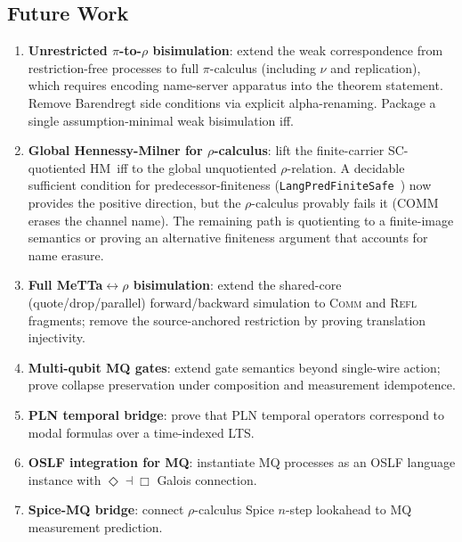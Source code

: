 \documentclass[11pt]{article}
\theoremstyle{definition}
\theoremstyle{remark}
\begin{document}
\subsection{Future Work}

\begin{enumerate}[leftmargin=1.5em]
  \item \textbf{Unrestricted $\pi$-to-$\rho$ bisimulation}: extend the
    weak correspondence from restriction-free processes to full
    $\pi$-calculus (including $\nu$ and replication), which requires
    encoding name-server apparatus into the theorem statement.  Remove
    Barendregt side conditions via explicit alpha-renaming.  Package a
    single assumption-minimal weak bisimulation iff.
  \item \textbf{Global Hennessy-Milner for $\rho$-calculus}: lift the
    finite-carrier SC-quotiented HM~iff to the global unquotiented
    $\rho$-relation.  A decidable sufficient condition for
    predecessor-finiteness (\texttt{LangPredFiniteSafe}~\cite{leanOSLF2025})
    now provides the positive direction, but the $\rho$-calculus provably
    fails it (COMM erases the channel name).  The remaining path is
    quotienting to a finite-image semantics or proving an alternative
    finiteness argument that accounts for name erasure.
  \item \textbf{Full MeTTa$\leftrightarrow$$\rho$ bisimulation}: extend
    the shared-core (quote/drop/parallel) forward/backward simulation to
    \textsc{Comm} and \textsc{Refl} fragments; remove the
    source-anchored restriction by proving translation injectivity.
  \item \textbf{Multi-qubit MQ gates}: extend gate semantics beyond
    single-wire action; prove collapse preservation under composition
    and measurement idempotence.
  \item \textbf{PLN temporal bridge}: prove that PLN temporal operators
    correspond to modal formulas over a time-indexed LTS.
  \item \textbf{OSLF integration for MQ}: instantiate MQ processes as an
    OSLF language instance with $\Diamond \dashv \Box$ Galois
    connection.
  \item \textbf{Spice-MQ bridge}: connect $\rho$-calculus Spice
    $n$-step lookahead to MQ measurement prediction.
\end{enumerate}



\end{document}

